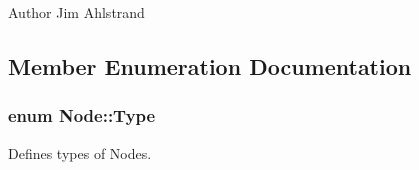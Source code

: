 \begin{DoxyAuthor}{Author}
Jim Ahlstrand 
\end{DoxyAuthor}


\subsection{Member Enumeration Documentation}
\hypertarget{classNode_a8dad370be1595f49e0a7c2406a91e867}{}
\subsubsection[{Type}]{\setlength{\rightskip}{0pt plus 5cm}enum {\bf Node\+::\+Type}}\label{classNode_a8dad370be1595f49e0a7c2406a91e867}


Defines types of Nodes. 

